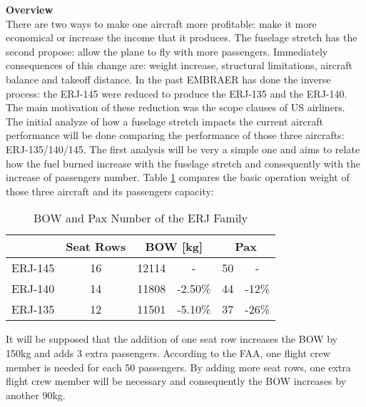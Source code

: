 \textbf{Overview}\\
There are two ways to make one aircraft more profitable: make it more economical or increase the income that it produces. The fuselage stretch has the second propose: allow the plane to fly with more passengers. Immediately consequences of this change are: weight increase, structural limitations, aircraft balance and takeoff distance.
In the past EMBRAER has done the inverse process: the ERJ-145 were reduced to produce the ERJ-135 and the ERJ-140. The main motivation of these reduction was the scope clauses of US airliners. The initial analyze of how a fuselage stretch impacts the current aircraft performance will be done comparing the performance of those three aircrafts: ERJ-135/140/145. The first analysis will be very a simple one and aims to relate how the fuel burned increase with the fuselage stretch and consequently with the increase of passengers number.
	Table \ref{tab:BOW} compares the basic operation weight of those three aircraft and its passengers capacity:

\begin{table}[htbp]
  \centering
  \caption{BOW and Pax Number of the ERJ Family}
    \begin{tabular}{cccccc}
    \toprule
          & Seat Rows & \multicolumn{2}{c}{BOW [kg]} & \multicolumn{2}{c}{Pax} \\
    \midrule
    ERJ-145 & 16    & 12114 & -     & 50    & - \\
    ERJ-140 & 14    & 11808 & -2.50\% & 44    & -12\% \\
    ERJ-135 & 12    & 11501 & -5.10\% & 37    & -26\% \\
    \bottomrule
    \end{tabular}%
  \label{tab:BOW}%
\end{table}%

It will be supposed that the addition of one seat row increases the BOW by 150kg and adds 3 extra passengers. According to the FAA, one flight crew member is needed for each 50 passengers. By adding more seat rows, one extra flight crew member will be necessary and consequently the BOW increases by another 90kg.

